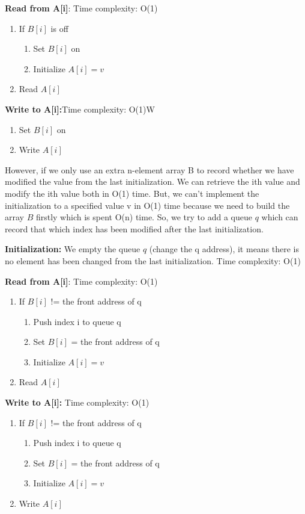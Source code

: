 \begin{homeworkProblem}
\textbf{Read from A[i]}: Time complexity: O(1)

    \begin{enumerate}
        \item If $B[i]$ is off
            \begin{enumerate}
                \item Set $B[i]$ on
                \item Initialize $A[i] = v$
            \end{enumerate}
        \item Read $A[i]$
    \end{enumerate}

\textbf{Write to A[i]:}Time complexity: O(1)W
    \begin{enumerate}
        \item Set $B[i]$ on
        \item Write $A[i]$
    \end{enumerate}

However, if we only use an extra n-element array B to record whether we have modified the value from the last initialization. We can retrieve the ith value and modify the ith value both in O(1) time. But, we can't implement the initialization to a specified value v in O(1) time because we need to build the array $B$ firstly which is spent O(n) time. So, we try to add a queue $q$ which can record that which index has been modified after the last initialization.

\textbf{Initialization:} We empty the queue $q$ (change the q address), it means there is no element has been changed from the last initialization. Time complexity: O(1)

\textbf{Read from A[i]}: Time complexity: O(1)
    \begin{enumerate}
        \item If $B[i]$ != the front address of q
            \begin{enumerate}
                \item Push index i to queue q 
                \item Set $B[i]$ = the front address of q
                \item Initialize $A[i] = v$
            \end{enumerate}
        \item Read $A[i]$
    \end{enumerate}

\textbf{Write to A[i]:} Time complexity: O(1)
    \begin{enumerate}
        \item If $B[i]$ != the front address of q
            \begin{enumerate}
                \item Push index i to queue q 
                \item Set $B[i]$ = the front address of q 
                \item Initialize $A[i] = v$
            \end{enumerate}
        \item Write $A[i]$
    \end{enumerate}


\end{homeworkProblem}
